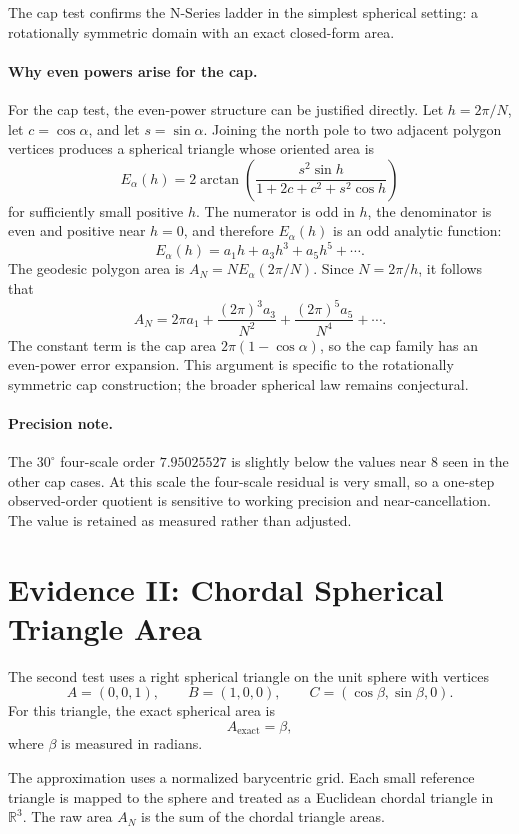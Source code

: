\documentclass[11pt]{article}
\begin{document}
The cap test confirms the N-Series ladder in the simplest spherical setting:
a rotationally symmetric domain with an exact closed-form area.


\paragraph{Why even powers arise for the cap.}
For the cap test, the even-power structure can be justified directly.  Let
$h=2\pi/N$, let $c=\cos\alpha$, and let $s=\sin\alpha$.  Joining the north
pole to two adjacent polygon vertices produces a spherical triangle whose
oriented area is
\[
  E_\alpha(h)
  =
  2\arctan\!\left(
    \frac{s^2\sin h}
         {1+2c+c^2+s^2\cos h}
  \right)
\]
for sufficiently small positive $h$.  The numerator is odd in $h$, the
denominator is even and positive near $h=0$, and therefore $E_\alpha(h)$ is
an odd analytic function:
\[
  E_\alpha(h)=a_1h+a_3h^3+a_5h^5+\cdots .
\]
The geodesic polygon area is $A_N=N E_\alpha(2\pi/N)$.  Since
$N=2\pi/h$, it follows that
\[
  A_N
  =2\pi a_1
   +\frac{(2\pi)^3a_3}{N^2}
   +\frac{(2\pi)^5a_5}{N^4}
   +\cdots .
\]
The constant term is the cap area $2\pi(1-\cos\alpha)$, so the cap family has
an even-power error expansion.  This argument is specific to the rotationally
symmetric cap construction; the broader spherical law remains conjectural.

\paragraph{Precision note.}
The $30^\circ$ four-scale order $7.95025527$ is slightly below the values near
$8$ seen in the other cap cases.  At this scale the four-scale residual is
very small, so a one-step observed-order quotient is sensitive to working
precision and near-cancellation.  The value is retained as measured rather
than adjusted.

\section{Evidence II: Chordal Spherical Triangle Area}

The second test uses a right spherical triangle on the unit sphere with
vertices
\[
  A=(0,0,1),
  \qquad
  B=(1,0,0),
  \qquad
  C=(\cos\beta,\sin\beta,0).
\]
For this triangle, the exact spherical area is
\[
  A_{\mathrm{exact}}=\beta,
\]
where $\beta$ is measured in radians.

The approximation uses a normalized barycentric grid.  Each small reference
triangle is mapped to the sphere and treated as a Euclidean chordal triangle
in $\mathbb{R}^3$.  The raw area $A_N$ is the sum of the chordal triangle
areas.
\end{document}
